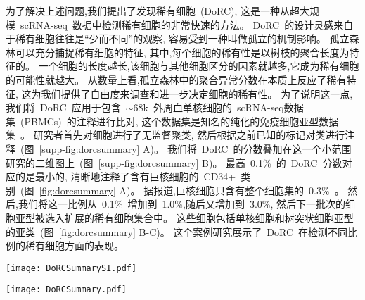 为了解决上述问题,我们提出了发现稀有细胞~(DoRC),
这是一种从超大规模~scRNA-seq~数据中检测稀有细胞的非常快速的方法。
DoRC~的设计灵感来自于稀有细胞往往是``少而不同”的观察, 容易受到一种叫做孤立的机制影响。
孤立森林可以充分捕捉稀有细胞的特征,
其中,每个细胞的稀有性是以树枝的聚合长度为特征的。
一个细胞的长度越长,该细胞与其他细胞区分的因素就越多,它成为稀有细胞的可能性就越大。
从数量上看,孤立森林中的聚合异常分数在本质上反应了稀有特征,
这为我们提供了自由度来调查和进一步决定细胞的稀有性。
为了说明这一点,我们将~DoRC~应用于包含~${\sim}68$k~外周血单核细胞的~scRNA-seq数据集~(PBMCs)~的注释进行比对,
这个数据集是知名的纯化的免疫细胞亚型数据集~\cite{zheng2017massively}。
研究者首先对细胞进行了无监督聚类,
然后根据之前已知的标记对类进行注释~(图~\ref{supp-fig:dorcsummary} A)。
我们将~DoRC~的分数叠加在这一个小范围研究的二维图上~(图~\ref{supp-fig:dorcsummary} B)。
最高~0.1\%~的~DoRC~分数对应的是最小的, 
清晰地注释了含有巨核细胞的~CD34+~类别~(图~\ref{fig:dorcsummary} A)。
据报道,巨核细胞只含有整个细胞集的~0.3\%~\cite{zheng2017massively}。
然后,我们将这一比例从~0.1\%~增加到~1.0\%,随后又增加到~3.0\%,
然后下一批次的细胞亚型被选入扩展的稀有细胞集合中。
这些细胞包括单核细胞和树突状细胞亚型的亚类~(图~\ref{fig:dorcsummary} B-C)。
这个案例研究展示了~DoRC~在检测不同比例的稀有细胞方面的表现。

\begin{figure*}[!htbp]
    \centering
    \texttt{[image: DoRCSummarySI.pdf]}
    \caption{
    DoRC在~PBMCs\_68k~上的性能评估。
    (A)~基于~t-SNE~的二维嵌入数据集可视化图,对应鉴定的类别用不同的颜色标记,如~Zheng~等人报道的~\cite{zheng2017massively}。
    (B)~PBMCs\_68k~上细胞的~DoRC~得分热图。巨核细胞群~(0.3\%),是所有细胞类型中最稀有的细胞,获得了最高的~DoRC~分数。
    (C)~使用~IQR-阈值标准的~DoRC~识别的稀有细胞。
    }
    \label{supp-fig:dorcsummary}
\end{figure*}

\begin{figure*}[!htbp]
    \centering
    \texttt{[image: DoRCSummary.pdf]}
    \caption{
    DoRC发现了不同稀有度的细胞。在~${\sim}68$~PBMC~数据~cite{zheng2017massively}~中,不同级别的稀有度对应了一个数量不断增加的稀有细胞群。
    (A-C)~根据~DoRC~得分选出的前~0.1\%、1.0\%~和~3.0\%~的细胞分别以高亮显示。    
    }
    \label{fig:dorcsummary}
\end{figure*}

